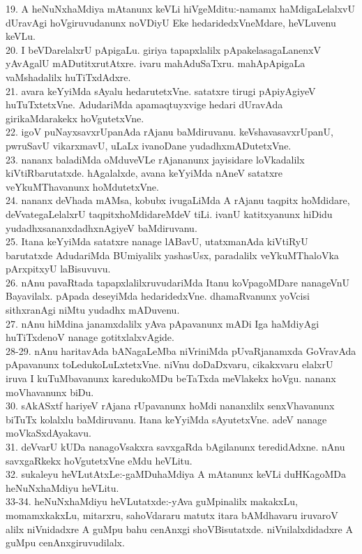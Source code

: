 \documentclass{article}
\begin{document}
19. A heNuNxhaMdiya mAtanunx keVLi hiVgeMditu:-namamx haMdigaLelalxvU dUravAgi hoVgiruvudanunx noVDiyU Eke hedaridedxVneMdare, heVLuvenu keVLu.\\
20. I beVDarelalxrU pApigaLu. giriya tapapxlalilx pApakelasagaLanenxV yAvAgalU mADutitxrutAtxre. ivaru mahAduSaTxru. mahApApigaLa vaMshadalilx huTiTxdAdxre.\\
21. avara keYyiMda sAyalu hedarutetxVne. satatxre tirugi pApiyAgiyeV huTuTxtetxVne. AdudariMda apamaqtuyxvige hedari dUravAda girikaMdarakekx hoVgutetxVne.\\
22. igoV puNayxsavxrUpanAda rAjanu baMdiruvanu. keVshavasavxrUpanU, pwruSavU vikarxmavU, uLaLx ivanoDane yudadhxmADutetxVne.\\
23. nananx baladiMda oMduveVLe rAjananunx jayisidare loVkadalilx kiVtiRbarutatxde. hAgalalxde, avana keYyiMda nAneV satatxre veYkuMThavanunx hoMdutetxVne.\\
24. nananx deVhada mAMsa, kobubx ivugaLiMda A rAjanu taqpitx hoMdidare, deVvategaLelalxrU taqpitxhoMdidareMdeV tiLi. ivanU katitxyanunx hiDidu yudadhxsananxdadhxnAgiyeV baMdiruvanu.\\
25. Itana keYyiMda satatxre nanage lABavU, utatxmanAda kiVtiRyU barutatxde AdudariMda BUmiyalilx yashasUsx, paradalilx veYkuMThaloVka pArxpitxyU laBisuvuvu.\\
26. nAnu pavaRtada tapapxlalilxruvudariMda Itanu koVpagoMDare nanageVnU Bayavilalx. pApada deseyiMda hedaridedxVne. dhamaRvanunx yoVcisi sithxranAgi niMtu yudadhx mADuvenu.\\
27. nAnu hiMdina janamxdalilx yAva pApavanunx mADi Iga haMdiyAgi huTiTxdenoV nanage gotitxlalxvAgide.\\
28-29. nAnu haritavAda bANagaLeMba niVriniMda pUvaRjanamxda GoVravAda pApavanunx toLedukoLuLxtetxVne. niVnu doDaDxvaru, cikakxvaru elalxrU iruva I kuTuMbavanunx karedukoMDu beTaTxda meVlakekx hoVgu. nananx moVhavanunx biDu.\\
30. sAkASxtf hariyeV rAjana rUpavanunx hoMdi nananxlilx senxVhavanunx biTuTx kolalxlu baMdiruvanu. Itana keYyiMda sAyutetxVne. adeV nanage moVkaSxdAyakavu.\\
31. deVvarU kUDa nanagoVsakxra savxgaRda bAgilanunx teredidAdxne. nAnu savxgaRkekx hoVgutetxVne eMdu heVLitu.\\
32. sukaleyu heVLutAtxLe:-gaMDuhaMdiya A mAtanunx keVLi duHKagoMDa heNuNxhaMdiyu heVLitu.\\
33-34. heNuNxhaMdiyu heVLutatxde:-yAva guMpinalilx makakxLu, momamxkakxLu, mitarxru, sahoVdararu matutx itara bAMdhavaru iruvaroV alilx niVnidadxre A guMpu bahu cenAnxgi shoVBisutatxde. niVnilalxdidadxre A guMpu cenAnxgiruvudilalx.\\
\end{document}

